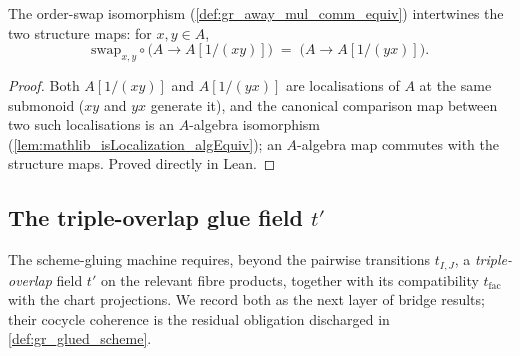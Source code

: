 \begin{lemma}\leanok
  \label{lem:gr_awayMulCommEquiv_comp_algebraMap}
  The order-swap isomorphism (\cref{def:gr_away_mul_comm_equiv}) intertwines the
  two structure maps: for \(x, y \in A\),
  \[
    \mathrm{swap}_{x,y} \circ \bigl(A \to A[1/(xy)]\bigr)
      \;=\; \bigl(A \to A[1/(yx)]\bigr).
  \]
\end{lemma}
\begin{proof}
  \leanok
  Both \(A[1/(xy)]\) and \(A[1/(yx)]\) are localisations of \(A\) at the same
  submonoid (\(xy\) and \(yx\) generate it), and the canonical comparison map
  between two such localisations is an \(A\)-algebra isomorphism
  (\cref{lem:mathlib_isLocalization_algEquiv}); an \(A\)-algebra map commutes with
  the structure maps. Proved directly in Lean.
\end{proof}


\subsection*{The triple-overlap glue field \(t'\)}

The scheme-gluing machine requires, beyond the pairwise transitions \(t_{I,J}\), a
\emph{triple-overlap} field \(t'\) on the relevant fibre products, together with
its compatibility \(t_{\mathrm{fac}}\) with the chart projections. We record both
as the next layer of bridge results; their cocycle coherence is the residual
obligation discharged in \cref{def:gr_glued_scheme}.

